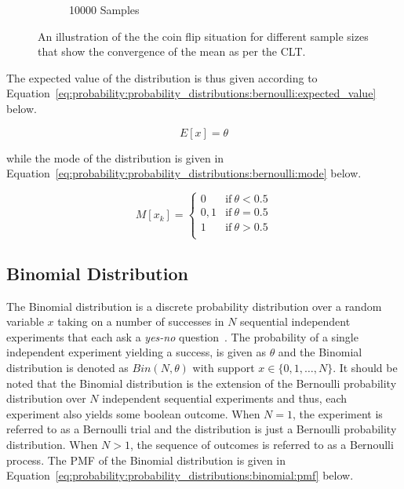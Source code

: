 \begin{figure}[htbp]
\begin{subfigure}{0.49\textwidth}
            \caption{10000 Samples}
            \label{fig:probability:probability_distributions:bernoulli:coin_10000}
      \end{subfigure}
      \par\bigskip
      \caption{An illustration of the the coin flip situation for different sample sizes that show the convergence of the mean as per the \acf{CLT}.}
      \label{fig:probability:probability_distributions:bernoulli:coin}
\end{figure}

\noindent
The expected value of the distribution is thus given according to Equation~\eqref{eq:probability:probability_distributions:bernoulli:expected_value} below.

\begin{equation}
      \label{eq:probability:probability_distributions:bernoulli:expected_value}
      E[x] = \theta
\end{equation}

\noindent
while the mode of the distribution is given in Equation~\eqref{eq:probability:probability_distributions:bernoulli:mode} below.

\begin{equation}
      \label{eq:probability:probability_distributions:bernoulli:mode}
      M[x_{k}] =
      \begin{cases}
            0   & \text{if}\ \theta < 0.5 \\
            0,1 & \text{if}\ \theta = 0.5 \\
            1   & \text{if}\ \theta > 0.5 \\
      \end{cases}
\end{equation}


\subsection{Binomial Distribution}\label{sec:probability:probability_distributions:bin}


The Binomial distribution is a discrete probability distribution over a random variable $x$ taking on a number of successes in $N$ sequential independent experiments that each ask a \textit{yes-no} question~\cite{ref:wackerly:2014}. The probability of a single independent experiment yielding a success, is given as $\theta$ and the Binomial distribution is denoted as $Bin(N, \theta)$ with support $x \in \{0, 1, \dots, N\}$.  It should be noted that the Binomial distribution is the extension of the Bernoulli probability distribution over $N$ independent sequential experiments and thus, each experiment also yields some boolean outcome. When $N=1$, the experiment is referred to as a Bernoulli trial and the distribution is just a Bernoulli probability distribution. When $N > 1$, the sequence of outcomes is referred to as a Bernoulli process. The \acf{PMF} of the Binomial distribution is given in Equation~\eqref{eq:probability:probability_distributions:binomial:pmf} below.

